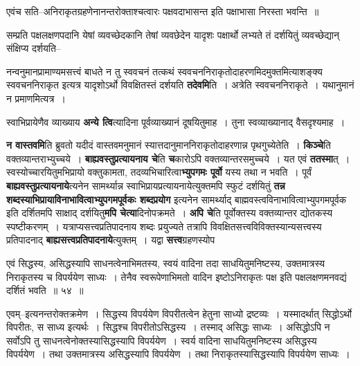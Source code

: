\documentclass[article,12pt,a4paper]{memoir}
\begin{document}
	  \pstart एवंच सति--अनिराकृतग्रहणेनानन्तरोक्ताश्चत्वारः पक्षवदाभासन्त इति पक्षाभासा निरस्ता भवन्ति ॥
	\pend
        

	  \pstart सम्प्रति पक्षलक्षणपदानि येषां व्यवच्छेदकानि तेषां व्यवछेदेन यादृशः पक्षार्थो लभ्यते तं दर्शयितुं व्यवच्छेद्यान् संक्षिप्य दर्शयति--
	\pend
      
	  \endgroup
	

	  \pstart नन्वनुमानप्रामाण्यमसत्त्वं बाधते न तु स्ववचनं तत्कथं स्ववचननिराकृतोदाहरणमिदमुक्तमित्याशङ्क्य स्ववचननिराकृत इत्यत्र यादृशोऽर्थो विवक्षितस्तं दर्शयति \textbf{तदेवमि}ति । अत्रेति स्ववचननिराकृते । यथानुमानं न प्रमाणमित्यत्र ।
	\pend
      

	  \pstart स्वाभिप्रायेणैव व्याख्याय \textbf{अन्ये त्वि}त्यादिना पूर्वव्याख्यानं दूषयितुमाह । तुना स्वव्याख्यानाद् वैसदृश्यमाह ।
	\pend
      

	  \pstart \textbf{न वास्तवमि}ति ब्रुवतो यदीदं वास्तवमनुमानं स्यात्तदानुमाननिराकृतोदाहरणान्न पृथगुच्येतेति । \textbf{किञ्चे}ति वक्तव्यान्तराभ्युच्चये । \textbf{बाह्यवस्तुप्रत्यायनाय चे}ति \textbf{च}कारोऽपि वक्तव्यान्तरसमुच्चये । यत एवं \textbf{ततस्मा}त् । स्वस्योच्चारयितुमभिप्रायो वक्तुकामता, तदव्यभिचारित्वा\textbf{भ्युपगमः पूर्वो} यस्य तथा न भवति । पूर्वं \textbf{बाह्यवस्तुप्रत्यायनाये}त्यनेन सामर्थ्यान्न स्वाभिप्रायप्रत्यायनायेत्युक्तमपि स्फुटं दर्शयितुं \textbf{तन्न शब्दस्याभिप्रायाविनाभावित्वाभ्युपगमपूर्वकः शब्दप्रयोग} इत्यनेन सामर्थ्याद् बाह्मवस्त्वविनाभावित्वाभ्युपगमपूर्वक इति दर्शितमपि साक्षाद् दर्शयितु\textbf{मपि चेत्या}दिनोपक्रमते । \textbf{अपि चे}ति पूर्वोक्तस्य वक्तव्यान्तर द्योतकस्य स्पष्टीकरणम् । यत्राप्यसत्त्वप्रतिपादनाय शब्दः प्रयुज्यते तत्रापि विवक्षितसत्त्वविविक्तस्यान्यसत्त्वस्य प्रतिपादनाद् \textbf{बाह्यसत्त्वप्रतिपादनाये}त्युक्तम् । यद्वा \textbf{सत्त्व}ग्रहणस्योप  \leavevmode{} 
	  
	एवं सिद्धस्य, असिद्धस्यापि साधनत्वेनाभिमतस्य, स्वयं वादिना तदा साधयितुमनिष्टस्य, उक्तमात्रस्य निराकृतस्य च विपर्ययेण साध्यः । तेनैव स्वरूपेणाभिमतो वादिन इष्टोऽनिराकृतः पक्ष इति पक्षलक्षणमनवद्यं दर्शितं भवति ॥ ५४ ॥ 
	  
	एवम्--इत्यनन्तरोक्तक्रमेण । सिद्धस्य विपर्ययेण विपरीतत्वेन हेतुना साध्यो द्रष्टव्यः । यस्मादर्थात् सिद्धोऽर्थो विपरीतः, स साध्य इत्यर्थः । सिद्धश्च विपरीतोऽसिद्धस्य । तस्माद् असिद्धः साध्यः । असिद्धोऽपि न सर्वोऽपि तु साधनत्वेनोक्तस्यासिद्धस्यापि विपर्ययेण । स्वर्य वादिना साधयितुमनिष्टस्य असिद्धस्य विपर्ययेण । तथा उक्तमात्रस्य असिद्धस्यापि विपर्ययेण । तथा निराकृतस्यासिद्धस्यापि विपर्ययेण साध्यः ।  
	  
\end{document}
